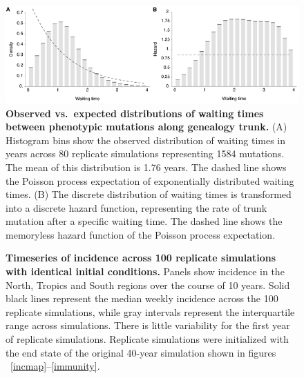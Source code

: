 \documentclass[11pt,oneside,letterpaper]{article}
\begin{document}
\begin{figure}[H]
	\centering
	\includegraphics{figures/waittimes}
	\caption{\textbf{Observed vs.\ expected distributions of waiting times between phenotypic mutations along genealogy trunk.} (A) Histogram bins show the observed distribution of waiting times in years across 80 replicate simulations representing 1584 mutations.  The mean of this distribution is 1.76 years.  The dashed line shows the Poisson process expectation of exponentially distributed waiting times.  (B) The discrete distribution of waiting times is transformed into a discrete hazard function, representing the rate of trunk mutation after a specific waiting time.  The dashed line shows the memoryless hazard function of the Poisson process expectation.}
	\label{waittimes}
\end{figure}

\begin{figure}[H]
	\centering
	\caption{\textbf{Timeseries of incidence across 100 replicate simulations with identical initial conditions.} Panels show incidence in the North, Tropics and South regions over the course of 10 years.  Solid black lines represent the median weekly incidence across the 100 replicate simulations, while gray intervals represent the interquartile range across simulations.  There is little variability for the first year of replicate simulations.  Replicate simulations were initialized with the end state of the original 40-year simulation shown in figures ~\ref{incmap}--\ref{immunity}.}
	\label{replicatetimeseries}
\end{figure}
\end{document}
